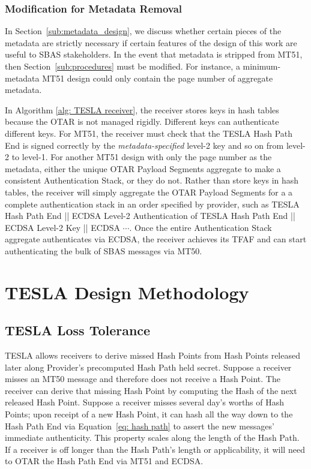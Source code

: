 \documentclass[letterpaper,times]{IONconf/IONconf}
\begin{document}
		\subsubsection{Modification for Metadata Removal}

			In Section~\ref{sub:metadata_design}, we discuss whether certain pieces of the metadata are strictly necessary if certain features of the design of this work are useful to SBAS stakeholders.
			In the event that metadata is stripped from MT51, then Section~\ref{sub:procedures} must be modified.
			For instance, a minimum-metadata MT51 design could only contain the page number of aggregate metadata.

			In Algorithm \ref{alg: TESLA receiver}, the receiver stores keys in hash tables because the OTAR is not managed rigidly.
			Different keys can authenticate different keys.
			For MT51, the receiver must check that the TESLA Hash Path End is signed correctly by the {\em metadata-specified} level-2 key and so on from level-2 to level-1. 
			For another MT51 design with only the page number as the metadata, either the unique OTAR Payload Segments aggregate to make a consistent Authentication Stack, or they do not.
			Rather than store keys in hash tables, the receiver will simply aggregate the OTAR Payload Segments for a a complete authentication stack in an order specified by provider, such as TESLA Hash Path End || ECDSA Level-2 Authentication of TESLA Hash Path End || ECDSA Level-2 Key || ECDSA $\cdots$.
			Once the entire Authentication Stack aggregate authenticates via ECDSA, the receiver achieves its TFAF and can start authenticating the bulk of SBAS messages via MT50.

\section{TESLA Design Methodology} \label{sec:tesla_design_methodology}

	\subsection{TESLA Loss Tolerance} \label{sub:tesla_loss_tolerance}

		TESLA allows receivers to derive missed Hash Points from Hash Points released later along Provider's precomputed Hash Path held secret.
		Suppose a receiver misses an MT50 message and therefore does not receive a Hash Point.
		The receiver can derive that missing Hash Point by computing the Hash of the next released Hash Point.
		Suppose a receiver misses several day's worths of Hash Points; upon receipt of a new Hash Point, it can hash all the way down to the Hash Path End via Equation~\eqref{eq: hash path} to assert the new messages' immediate authenticity.
		This property scales along the length of the Hash Path.
		If a receiver is off longer than the Hash Path's length or applicability, it will need to OTAR the Hash Path End via MT51 and ECDSA.
\end{document}
